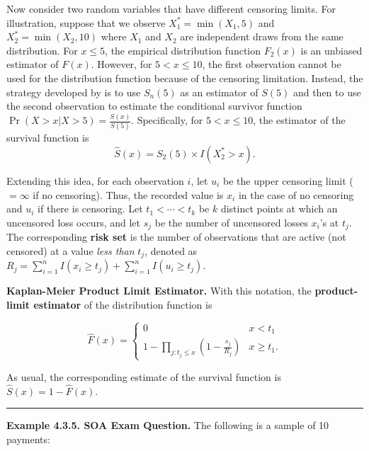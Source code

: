 \documentclass[]{book}
\theoremstyle{definition}
\theoremstyle{definition}
\theoremstyle{definition}
\theoremstyle{remark}
\begin{document}
Now consider two random variables that have different censoring limits.
For illustration, suppose that we observe \(X_1^* = \min(X_1, 5)\) and
\(X_2^* = \min(X_2, 10)\) where \(X_1\) and \(X_2\) are independent
draws from the same distribution. For \(x \le 5\), the empirical
distribution function \(F_2(x)\) is an unbiased estimator of \(F(x)\).
However, for \(5 < x \le 10\), the first observation cannot be used for
the distribution function because of the censoring limitation. Instead,
the strategy developed by \citep{kaplan1958} is to use \(S_n(5)\) as an
estimator of \(S(5)\) and then to use the second observation to estimate
the conditional survivor function
\(\Pr(X > x | X >5) = \frac{S(x)}{S(5)}\). Specifically, for
\(5 < x \le 10\), the estimator of the survival function is \[
\hat{S}(x) = S_2(5) \times I(X_2^* > x ) .
\]

Extending this idea, for each observation \(i\), let \(u_i\) be the
upper censoring limit (\(=\infty\) if no censoring). Thus, the recorded
value is \(x_i\) in the case of no censoring and \(u_i\) if there is
censoring. Let \(t_{1} <\cdots< t_{k}\) be \(k\) distinct points at
which an uncensored loss occurs, and let \(s_j\) be the number of
uncensored losses \(x_i\)'s at \(t_{j}\). The corresponding \textbf{risk
set} is the number of observations that are active (not censored) at a
value \emph{less than} \(t_{j}\), denoted as
\(R_j = \sum_{i=1}^n I(x_i \geq t_{j}) + \sum_{i=1}^n I(u_i \geq t_{j})\).

\textbf{Kaplan-Meier Product Limit Estimator.} With this notation, the
\textbf{product-limit estimator} of the distribution function is

\begin{equation}
\hat{F}(x) =
\left\{
\begin{array}{ll}
0 & x<t_{1} \\
1-\prod_{j:t_{j} \leq x}\left( 1-\frac{s_j}{R_{j}}\right) & x \geq t_{1} .
\end{array}
\right. \label{eq:KaplanMeier}
\end{equation}

As usual, the corresponding estimate of the survival function is
\(\hat{S}(x) = 1 - \hat{F}(x)\).

\begin{center}\rule{0.5\linewidth}{\linethickness}\end{center}

\textbf{Example 4.3.5. SOA Exam Question.} The following is a sample of
10 payments:
\end{document}

